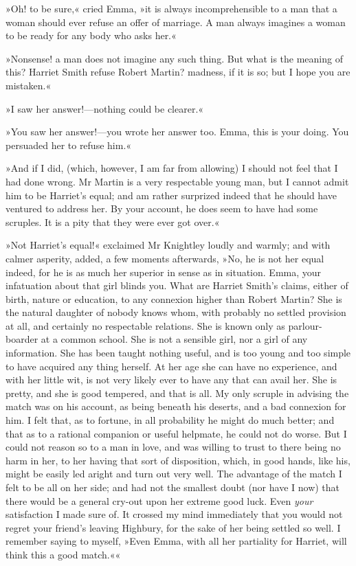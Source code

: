 »Oh! to be sure,« cried Emma, »it is always incomprehensible to a man that a woman should ever refuse an offer of marriage. A man always imagines a woman to be ready for any body who asks her.«

»Nonsense! a man does not imagine any such thing. But what is the meaning of this? Harriet Smith refuse Robert Martin? madness, if it is so; but I hope you are mistaken.«

»I saw her answer!—nothing could be clearer.«

»You saw her answer!—you wrote her answer too. Emma, this is your doing. You persuaded her to refuse him.«

»And if I did, (which, however, I am far from allowing) I should not feel that I had done wrong. Mr Martin is a very respectable young man, but I cannot admit him to be Harriet's equal; and am rather surprized indeed that he should have ventured to address her. By your account, he does seem to have had some scruples. It is a pity that they were ever got over.«

»Not Harriet's equal!« exclaimed Mr Knightley loudly and warmly; and with calmer asperity, added, a few moments afterwards, »No, he is not her equal indeed, for he is as much her superior in sense as in situation. Emma, your infatuation about that girl blinds you. What are Harriet Smith's claims, either of birth, nature or education, to any connexion higher than Robert Martin? She is the natural daughter of nobody knows whom, with probably no settled provision at all, and certainly no respectable relations. She is known only as parlour-boarder at a common school. She is not a sensible girl, nor a girl of any information. She has been taught nothing useful, and is too young and too simple to have acquired any thing herself. At her age she can have no experience, and with her little wit, is not very likely ever to have any that can avail her. She is pretty, and she is good tempered, and that is all. My only scruple in advising the match was on his account, as being beneath his deserts, and a bad connexion for him. I felt that, as to fortune, in all probability he might do much better; and that as to a rational companion or useful helpmate, he could not do worse. But I could not reason so to a man in love, and was willing to trust to there being no harm in her, to her having that sort of disposition, which, in good hands, like his, might be easily led aright and turn out very well. The advantage of the match I felt to be all on her side; and had not the smallest doubt (nor have I now) that there would be a general cry-out upon her extreme good luck. Even \textit{your} satisfaction I made sure of. It crossed my mind immediately that you would not regret your friend's leaving Highbury, for the sake of her being settled so well. I remember saying to myself, »Even Emma, with all her partiality for Harriet, will think this a good match.««

